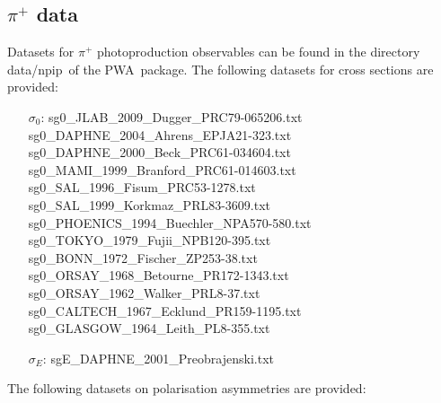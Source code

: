 \documentclass[a4paper,10pt]{article}
\def\PWA{\ttfamily PWA\rmfamily\ }
\def\tt{\ttfamily}
\def\rm{\rmfamily}
\begin{document}
\subsection{$\pi^+$ data}
Datasets for $\pi^+$ photoproduction observables can be found in the directory 
\tt data/npip\rm\ of the \PWA package. The following datasets for cross sections are provided:
\begin{itemize}
\item[$\sigma_0$:\:]
\tt sg0\_JLAB\_2009\_Dugger\_PRC79-065206.txt\rm \\
\tt sg0\_DAPHNE\_2004\_Ahrens\_EPJA21-323.txt\rm \\
\tt sg0\_DAPHNE\_2000\_Beck\_PRC61-034604.txt\rm \\
\tt sg0\_MAMI\_1999\_Branford\_PRC61-014603.txt\rm \\
\tt sg0\_SAL\_1996\_Fisum\_PRC53-1278.txt\rm \\
\tt sg0\_SAL\_1999\_Korkmaz\_PRL83-3609.txt\rm \\
\tt sg0\_PHOENICS\_1994\_Buechler\_NPA570-580.txt\rm \\
\tt sg0\_TOKYO\_1979\_Fujii\_NPB120-395.txt\rm \\
\tt sg0\_BONN\_1972\_Fischer\_ZP253-38.txt\rm \\
\tt sg0\_ORSAY\_1968\_Betourne\_PR172-1343.txt\rm \\
\tt sg0\_ORSAY\_1962\_Walker\_PRL8-37.txt\rm \\
\tt sg0\_CALTECH\_1967\_Ecklund\_PR159-1195.txt\rm \\
\tt sg0\_GLASGOW\_1964\_Leith\_PL8-355.txt\rm

\item[$\sigma_E$:\:]
\tt sgE\_DAPHNE\_2001\_Preobrajenski.txt\rm
\end{itemize}
The following datasets on polarisation asymmetries are provided:
\end{document}
